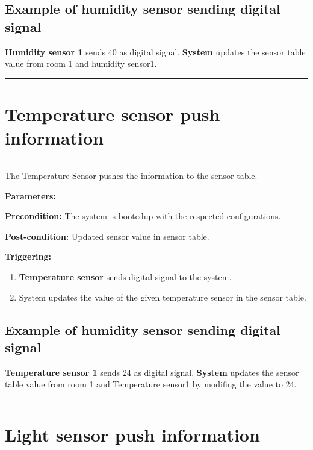 \subsection{Example of humidity sensor sending digital signal}
\textbf{Humidity sensor 1} sends 40 as digital signal. \textbf{System} updates
the sensor table value from room 1 and humidity sensor1.
\hfill
\vspace{0.5cm}
\hrule


\section{Temperature sensor push information}

\hrule
\hfill
\vspace{0.5cm}
\label{operation:Temperature sensor push information}

The Temperature Sensor pushes the information to the sensor table.
\begin{description}
\item \textbf{Parameters:} 
\item \textbf{Precondition:} The system is bootedup with the respected
configurations.
\item \textbf{Post-condition:} Updated sensor value in sensor table.

\item \textbf{Triggering:}
\begin{enumerate}
\item \textbf{Temperature sensor} sends digital signal to the system.
\item System updates the value of the given temperature sensor in the sensor
table.
\end{enumerate}
\end{description}

\subsection{Example of humidity sensor sending digital signal}
\textbf{Temperature sensor 1} sends 24 as digital signal. \textbf{System}
updates the sensor table value from room 1 and Temperature sensor1 by modifing
the value to 24.
\hfill
\vspace{0.5cm}
\hrule

\break
\section{Light sensor push information}

